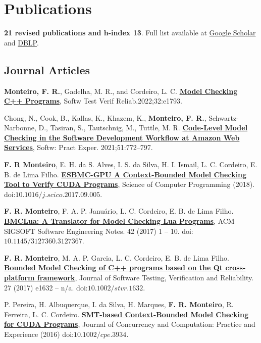 \documentclass[letterpaper]{article}
\renewenvironment{itemize}{
  \begin{list}{}{
    \setlength{\leftmargin}{1.5em}
  }
}{
  \end{list}
}
\begin{document}
\section*{Publications}

{\bf 21 revised publications and h-index 13}. Full list available at \href{https://scholar.google.com/citations?hl=en&user=6bNQcz0AAAAJ}{Google Scholar} and \href{https://dblp.uni-trier.de/pers/hd/m/Monteiro:Felipe_R=}{DBLP}.

\subsection*{Journal Articles}

\begin{itemize}

\item {\bf Monteiro, F. R.}, Gadelha, M. R., and Cordeiro, L. C. \href{https://onlinelibrary.wiley.com/doi/pdf/10.1002/stvr.1793}{{\bf Model Checking C++ Programs}}, Softw Test Verif Reliab.2022;32:e1793.

\item Chong, N., Cook, B., Kallas, K., Khazem, K., {\bf Monteiro, F. R.}, Schwartz-Narbonne, D., Tasiran, S., Tautschnig, M., Tuttle, M. R. \href{https://onlinelibrary.wiley.com/doi/pdf/10.1002/spe.2949}{{\bf Code-Level Model Checking in the Software Development Workflow at Amazon Web Services}}, Softw: Pract Exper. 2021;51:772–797.

\item {\bf F. R Monteiro}, E. H. da S. Alves, I. S. da Silva, H. I. Ismail, L. C. Cordeiro, E. B. de Lima Filho. \href{http://www.sciencedirect.com/science/article/pii/S0167642317301934}{{\bf ESBMC-GPU A Context-Bounded Model Checking Tool to Verify CUDA Programs}}, Science of Computer Programming (2018). doi:$10.1016/j.scico.2017.09.005$.

\item {\bf F. R. Monteiro}, F. A. P. Janu\'{a}rio, L. C. Cordeiro, E. B. de Lima Filho. \href{https://dl.acm.org/citation.cfm?id=3127367}{{\bf BMCLua: A Translator for Model Checking Lua Programs}}, ACM SIGSOFT Software Engineering Notes. 42 (2017) 1 -- 10. doi:$10.1145/3127360.3127367$.

\item {\bf F. R. Monteiro}, M. A. P. Garcia, L. C. Cordeiro, E. B. de Lima Filho. \href{http://onlinelibrary.wiley.com/doi/10.1002/stvr.1632/full}{{\bf Bounded Model Checking of C++ programs based on the Qt cross-platform framework}}, Journal of Software Testing, Verification and Reliability. 27 (2017) e1632 -- n/a. doi:$10.1002/stvr.1632$.

\item P. Pereira, H. Albuquerque, I. da Silva, H. Marques, {\bf F. R. Monteiro}, R. Ferreira, L. C. Cordeiro. \href{http://onlinelibrary.wiley.com/doi/10.1002/cpe.3934/full}{{\bf SMT-based Context-Bounded Model Checking for CUDA Programs}}, Journal of Concurrency and Computation: Practice and Experience (2016) doi:$10.1002/cpe.3934$.

\end{itemize}
\end{document}
